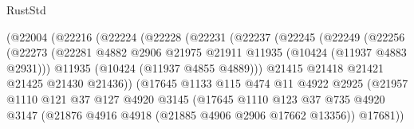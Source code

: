 \begin{lexlean}{RustStd}
\begin{coremodule}
                          (@22004
                            (@22216
                              (@22224
                                (@22228
                                  (@22231
                                    (@22237
                                      (@22245
                                        (@22249
                                          (@22256
                                            (@22273
                                              (@22281
                                                @4882
                                                @2906
                                                @21975
                                                @21911
                                                @11935
                                                (@10424 (@11937 @4883 @2931)))
                                              @11935
                                              (@10424 (@11937 @4855 @4889)))
                                            @21415
                                            @21418
                                            @21421
                                            @21425
                                            @21430
                                            @21436))
                                        (@17645
                                          @1133
                                          @115
                                          @474
                                          @11
                                          @4922
                                          @2925
                                          (@21957
                                            @1110
                                            @121
                                            @37
                                            @127
                                            @4920
                                            @3145
                                            (@17645
                                              @1110
                                              @123
                                              @37
                                              @735
                                              @4920
                                              @3147
                                              (@21876
                                                @4916
                                                @4918
                                                (@21885 @4906 @2906 @17662 @13356))
                                              @17681))

\end{coremodule}
\end{lexlean}
